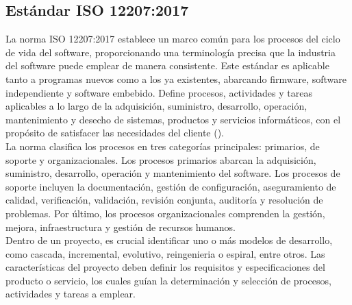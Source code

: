 \subsection{Estándar ISO 12207:2017}
La norma ISO 12207:2017 establece un marco común para los procesos del ciclo de vida del software, proporcionando una terminología precisa que la industria del software puede emplear de manera consistente. Este estándar es aplicable tanto a programas nuevos como a los ya existentes, abarcando firmware, software independiente y software embebido. Define procesos, actividades y tareas aplicables a lo largo de la adquisición, suministro, desarrollo, operación, mantenimiento y desecho de sistemas, productos y servicios informáticos, con el propósito de satisfacer las necesidades del cliente (\cite{amaru2022sistema}).\\
La norma clasifica los procesos en tres categorías principales: primarios, de soporte y organizacionales. Los procesos primarios abarcan la adquisición, suministro, desarrollo, operación y mantenimiento del software. Los procesos de soporte incluyen la documentación, gestión de configuración, aseguramiento de calidad, verificación, validación, revisión conjunta, auditoría y resolución de problemas. Por último, los procesos organizacionales comprenden la gestión, mejora, infraestructura y gestión de recursos humanos.\\
Dentro de un proyecto, es crucial identificar uno o más modelos de desarrollo, como cascada, incremental, evolutivo, reingenieria o espiral, entre otros. Las características del proyecto deben definir los requisitos y especificaciones del producto o servicio, los cuales guían la determinación y selección de procesos, actividades y tareas a emplear.
